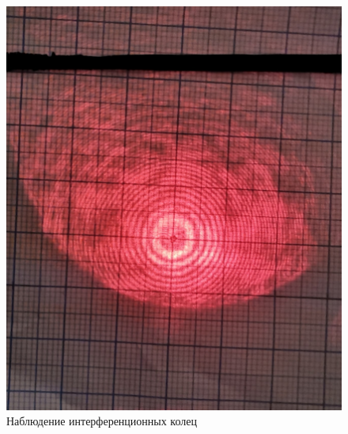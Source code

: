 \begin{figure}[h]
    \begin{minipage}[b]{0.4\textwidth}
        \includegraphics[width=\textwidth]{pics/rings.png}
        \caption{Наблюдение интерференционных колец}
    \end{minipage}
    \hfill
    \begin{minipage}[b]{0.4\textwidth}
  

\end{minipage}
\end{figure}
